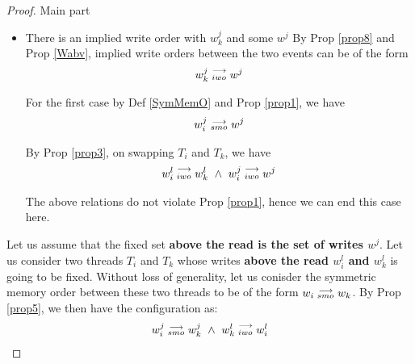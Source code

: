 \begin{proof}{Main part}
\begin{itemize}
\begin{itemize}
                            
                        \end{itemize}
                        
                    \item There is an implied write order with $w_k^j$ and some $w^j$
                        By Prop \ref{prop8} and Prop \ref{Wabv}, implied write orders between the two events can be of the form 
                        \begin{align*}
                            w_k^j\stackrel{\longrightarrow}{_{iwo}}w^j  
                        \end{align*}

                        For the first case by Def \ref{SymMemO} and Prop \ref{prop1}, we have
                        \begin{align*}
                            w_i^j\stackrel{\longrightarrow}{_{smo}}w^j
                        \end{align*}

                        By Prop \ref{prop3}, on swapping $T_i$ and $T_k$, we have 
                        \begin{align*}
                            \reln{w_i^l}{iwo}{w_k^l} \ \wedge \ \reln{w_i^j}{iwo}{w^j}
                        \end{align*}

                        The above relations do not violate Prop \ref{prop1}, hence we can end this case here. 
                \end{itemize}


                Let us assume that the fixed set \textbf{above the read is the set of writes $w^j$}. Let us consider two threads $T_i$ and $T_k$ whose writes \textbf{above the read $w_i^l$ and $w_k^l$} is going to be fixed. Without loss of generality, let us conisder the symmetric memory order between these two threads to be of the form $w_i\stackrel{\longrightarrow}{_{smo}}w_k$.  By Prop \ref{prop5}, we then have the configuration as:
                \begin{align*}
                    \reln{w_i^j}{smo}{w_k^j} \ \wedge \ \reln{w_k^l}{iwo}{w_i^l}
                \end{align*}


\end{proof}
